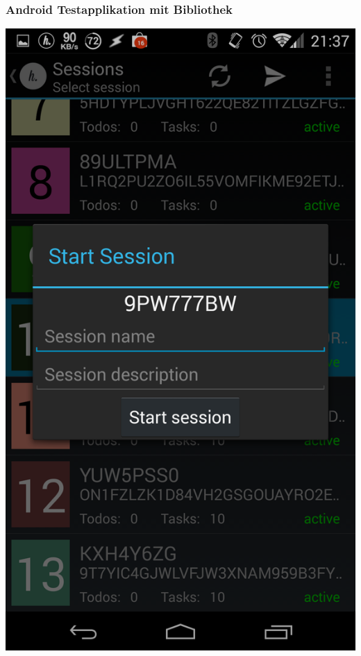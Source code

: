 \subsubsection{Android Testapplikation mit Bibliothek} \label{appendix:android}
\begin{minipage}[t]{0.45\textwidth}
\centering
	\includegraphics[width = \linewidth]{img/android/lib_session_dialog}
	\label{fig:lib_session_dialog}
\end{minipage}
